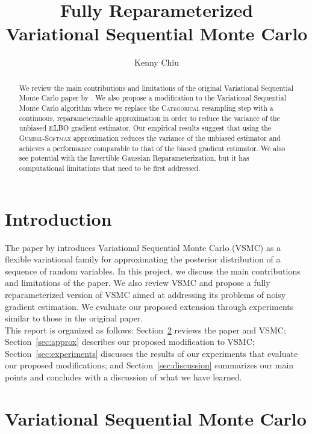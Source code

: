 \documentclass[12pt]{article}
\title{\vspace{-1.5cm}\textbf{Fully Reparameterized \\ Variational Sequential Monte Carlo}}
\author{Kenny Chiu}
\date{}
\newcommand{\vsmc}{\textsc{VSMC}\xspace}
\newcommand{\elbo}{\textsc{ELBO}\xspace}
\newcommand{\categorical}{\textsc{Categorical}\xspace}
\newcommand{\gumbelsoftmax}{\textsc{Gumbel-Softmax}\xspace}
\begin{document}
\maketitle
\thispagestyle{fancy}

\begin{abstract}
We review the main contributions and limitations of the original Variational Sequential Monte Carlo paper by \textcite{Naesseth:2018}. We also propose a modification to the Variational Sequential Monte Carlo algorithm where we replace the \categorical resampling step with a continuous, reparameterizable approximation in order to reduce the variance of the unbiased \elbo gradient estimator. Our empirical results suggest that using the \gumbelsoftmax approximation reduces the variance of the unbiased estimator and achieves a performance comparable to that of the biased gradient estimator. We also see potential with the Invertible Gaussian Reparameterization, but it has computational limitations that need to be first addressed.
\end{abstract}

\section{Introduction}

The paper by \textcite{Naesseth:2018} introduces Variational Sequential Monte Carlo (\vsmc) as a flexible variational family for approximating the posterior distribution of a sequence of random variables. In this project, we discuss the main contributions and limitations of the paper. We also review \vsmc and propose a fully reparameterized version of \vsmc aimed at addressing its problems of noisy gradient estimation. We evaluate our proposed extension through experiments similar to those in the original paper.
\\

This report is organized as follows: Section~\ref{sec:vsmc} reviews the paper and \vsmc; Section~\ref{sec:approx} describes our proposed modification to \vsmc; Section~\ref{sec:experiments} discusses the results of our experiments that evaluate our proposed modifications; and Section~\ref{sec:discussion} summarizes our main points and concludes with a discussion of what we have learned.


\section{Variational Sequential Monte Carlo}\label{sec:vsmc}
\end{document}
